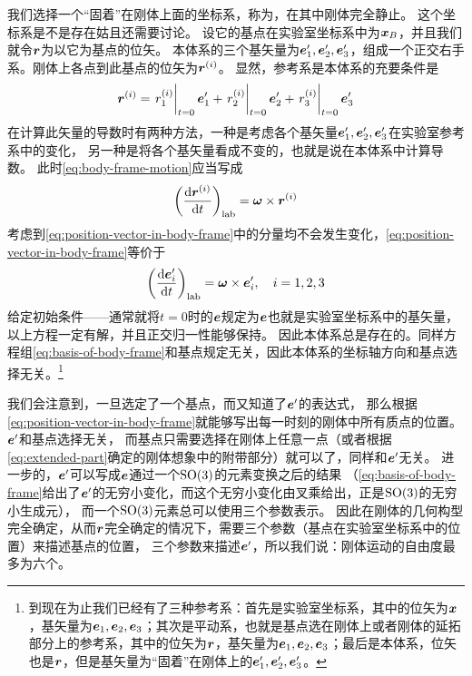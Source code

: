 我们选择一个“固着”在刚体上面的坐标系，称为，在其中刚体完全静止。
这个坐标系是不是存在姑且还需要讨论。
设它的基点在实验室坐标系中为$\vb*{x}_B$，并且我们就令$\vb*{r}$为以它为基点的位矢。
本体系的三个基矢量为$\vb*{e}'_1, \vb*{e}'_2, \vb*{e}'_3$，组成一个正交右手系。刚体上各点到此基点的位矢为$\vb*{r}^{(i)}$。
显然，参考系是本体系的充要条件是
\begin{equation}
    \vb*{r}^{(i)} = 
    \eval{r^{(i)}_1}_{t=0} \vb*{e}'_1 + \eval{r^{(i)}_2}_{t=0} \vb*{e}'_2 + \eval{r^{(i)}_3}_{t=0} \vb*{e}'_3
    \label{eq:position-vector-in-body-frame}
\end{equation}
在计算此矢量的导数时有两种方法，一种是考虑各个基矢量$\vb*{e}'_1, \vb*{e}'_2, \vb*{e}'_3$在实验室参考系中的变化，
另一种是将各个基矢量看成不变的，也就是说在本体系中计算导数。
此时\eqref{eq:body-frame-motion}应当写成
\[
    \left( \dv{\vb*{r}^{(i)}}{t} \right)_\text{lab} = \vb*{\omega} \times \vb*{r}^{(i)}
\]
考虑到\eqref{eq:position-vector-in-body-frame}中的分量均不会发生变化，\eqref{eq:position-vector-in-body-frame}等价于
\begin{equation}
    \left( \dv{\vb*{e}_i'}{t} \right)_\text{lab} = \vb*{\omega} \times \vb*{e}'_i, \quad i = 1, 2, 3
    \label{eq:basis-of-body-frame}
\end{equation}
给定初始条件——通常就将$t=0$时的$\vb*{e}$规定为$\vb*{e}$也就是实验室坐标系中的基矢量，以上方程一定有解，并且正交归一性能够保持。
因此本体系总是存在的。同样方程组\eqref{eq:basis-of-body-frame}和基点规定无关，因此本体系的坐标轴方向和基点选择无关。\footnote{到现在为止我们已经有了三种参考系：首先是实验室坐标系，其中的位矢为$\vb*{x}$，基矢量为$\vb*{e}_1, \vb*{e}_2, \vb*{e}_3$；其次是平动系，也就是基点选在刚体上或者刚体的延拓部分上的参考系，其中的位矢为$\vb*{r}$，基矢量为$\vb*{e}_1, \vb*{e}_2, \vb*{e}_3$；最后是本体系，位矢也是$\vb*{r}$，但是基矢量为“固着”在刚体上的$\vb*{e}'_1, \vb*{e}'_2, \vb*{e}'_3$。}

我们会注意到，一旦选定了一个基点，而又知道了$\vb*{e}'$的表达式，
那么根据\eqref{eq:position-vector-in-body-frame}就能够写出每一时刻的刚体中所有质点的位置。
$\vb*{e}'$和基点选择无关，
而基点只需要选择在刚体上任意一点（或者根据\eqref{eq:extended-part}确定的刚体想象中的附带部分）就可以了，同样和$\vb*{e}'$无关。
进一步的，$\vb*{e}'$可以写成$\vb*{e}$通过一个$\mathrm{SO}(3)$的元素变换之后的结果
（\eqref{eq:basis-of-body-frame}给出了$\vb*{e}'$的无穷小变化，而这个无穷小变化由叉乘给出，正是$\mathrm{SO}(3)$的无穷小生成元），
而一个$\mathrm{SO}(3)$元素总可以使用三个参数表示。
因此在刚体的几何构型完全确定，从而$\vb*{r}$完全确定的情况下，需要三个参数（基点在实验室坐标系中的位置）来描述基点的位置，
三个参数来描述$\vb*{e}'$，所以我们说：刚体运动的自由度最多为六个。

